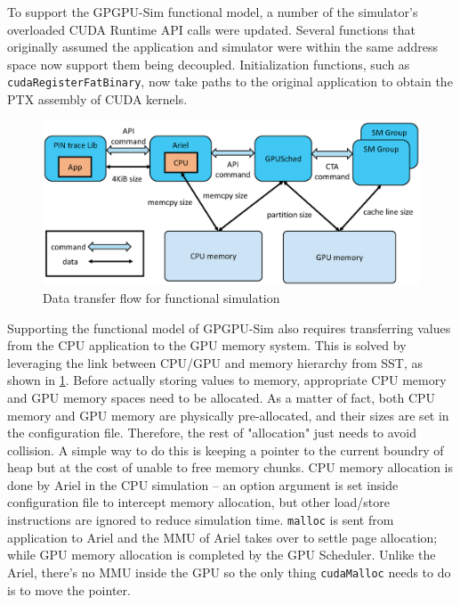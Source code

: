To support the GPGPU-Sim functional model, a number of the simulator's overloaded
CUDA Runtime API calls were updated. Several functions that originally assumed
the application and simulator were within the same address space now support them being
decoupled. Initialization functions, such as \texttt{\textunderscore \textunderscore
cudaRegisterFatBinary}, now take paths to the original application to obtain the PTX
assembly of CUDA kernels.


   \begin{figure}[!htb]
      \centering
      \setlength{\abovecaptionskip}{6pt plus 1pt minus 1pt}
      \includegraphics[width=.90\textwidth,keepaspectratio]{figures/transfer_flow.eps}
      \captionsetup{width=.75\textwidth}
      \caption{Data transfer flow for functional simulation}
      \label{fig:gpu_transfer_model}
   \end{figure}

Supporting the functional model of GPGPU-Sim also requires transferring values
from the CPU application to the GPU memory system. This is solved by leveraging
the link between CPU/GPU and memory hierarchy from SST, as shown in
\ref{fig:gpu_transfer_model}. Before actually storing values to memory, appropriate 
CPU memory and GPU memory spaces need to be allocated. As a matter of fact, both CPU memory 
and GPU memory are physically pre-allocated, and their sizes are set in the configuration file. 
Therefore, the rest of "allocation" just needs to avoid collision. A simple way to do this is
keeping a pointer to the current boundry of heap but at the cost of unable to free memory chunks. 
CPU memory allocation is done by Ariel in the CPU simulation -- an option argument is set inside 
configuration file to intercept memory allocation, but other load/store instructions are ignored 
to reduce simulation time. \texttt{malloc} is sent from application to Ariel and the MMU of Ariel takes 
over to settle page allocation; while GPU memory allocation is completed by the 
GPU Scheduler. Unlike the Ariel, there's no MMU inside the GPU so the only thing \texttt{cudaMalloc} 
needs to do is to move the pointer.

